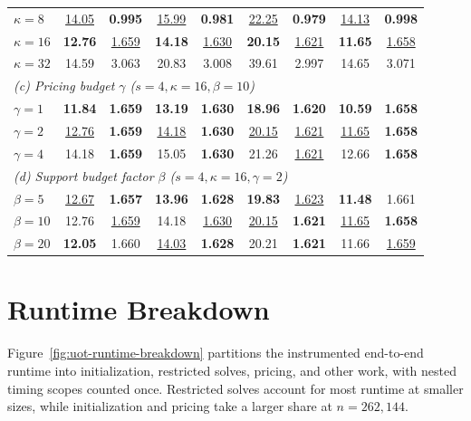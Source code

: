 \begin{table}[t]
\begin{tabular}{@{}l cc cc cc cc@{}}
$\kappa=8$ & \underline{14.05} & \textbf{0.995} & \underline{15.99} & \textbf{0.981} & \underline{22.25} & \textbf{0.979} & \underline{14.13} & \textbf{0.998} \\
$\kappa=16$ & \textbf{12.76} & \underline{1.659} & \textbf{14.18} & \underline{1.630} & \textbf{20.15} & \underline{1.621} & \textbf{11.65} & \underline{1.658} \\
$\kappa=32$ & 14.59 & 3.063 & 20.83 & 3.008 & 39.61 & 2.997 & 14.65 & 3.071 \\
\midrule
\multicolumn{9}{l}{\textit{(c) Pricing budget $\gamma$ ($s=4,\kappa=16,\beta=10$)}} \\
$\gamma=1$ & \textbf{11.84} & \textbf{1.659} & \textbf{13.19} & \textbf{1.630} & \textbf{18.96} & \textbf{1.620} & \textbf{10.59} & \textbf{1.658} \\
$\gamma=2$ & \underline{12.76} & \textbf{1.659} & \underline{14.18} & \textbf{1.630} & \underline{20.15} & \underline{1.621} & \underline{11.65} & \textbf{1.658} \\
$\gamma=4$ & 14.18 & \textbf{1.659} & 15.05 & \textbf{1.630} & 21.26 & \underline{1.621} & 12.66 & \textbf{1.658} \\
\midrule
\multicolumn{9}{l}{\textit{(d) Support budget factor $\beta$ ($s=4,\kappa=16,\gamma=2$)}} \\
$\beta=5$ & \underline{12.67} & \textbf{1.657} & \textbf{13.96} & \textbf{1.628} & \textbf{19.83} & \underline{1.623} & \textbf{11.48} & 1.661 \\
$\beta=10$ & 12.76 & \underline{1.659} & 14.18 & \underline{1.630} & \underline{20.15} & \textbf{1.621} & \underline{11.65} & \textbf{1.658} \\
$\beta=20$ & \textbf{12.05} & 1.660 & \underline{14.03} & \textbf{1.628} & 20.21 & \textbf{1.621} & 11.66 & \underline{1.659} \\
\bottomrule
\end{tabular}
\end{table}

\section{Runtime Breakdown}
\label{app:runtime-breakdown}

Figure~\ref{fig:uot-runtime-breakdown} partitions the instrumented end-to-end runtime into initialization, restricted solves, pricing, and other work, with nested timing scopes counted once.
Restricted solves account for most runtime at smaller sizes, while initialization and pricing take a larger share at $n=262{,}144$.


